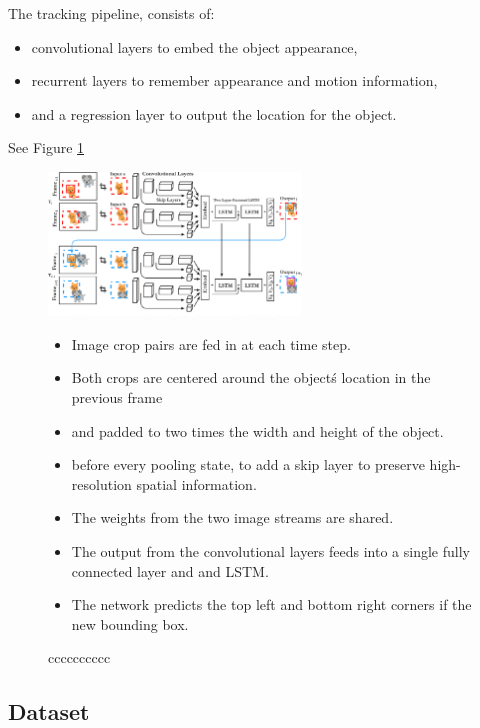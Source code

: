 \documentclass[a4paper]{article}
\begin{document}
The tracking pipeline, consists of:
\begin{itemize}
    \item convolutional layers to embed the object appearance, 
    \item recurrent layers to remember appearance and motion information, 
    \item and a regression layer to output the location for the object. 
\end{itemize}
See Figure \ref{fig:re3}

\begin{figure}[hb]
    \centering
    \includegraphics[width=0.6\textwidth]{figures/pipeline-re3.png}
    \caption{
            cccccccccc
    }
    \label{fig:re3}
    \medskip
    \small 
        \begin{itemize}
        \item Image crop pairs are fed in at each time step.
        \item Both crops are centered around the object\'s location in the previous frame 
        \item and padded to two times the width and height of the object. 
        \item before every pooling state, to add a skip layer to preserve high-resolution spatial information.
        \item The weights from the two image streams are shared.
        \item The output from the convolutional layers feeds into a single fully connected layer and  and LSTM.
        \item The network predicts the top left and bottom right corners if the new bounding box.  
        \end{itemize}
\end{figure}


\subsection{Dataset}
\end{document}
